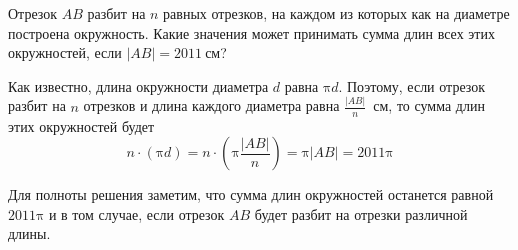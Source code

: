 ﻿


\begin{itemize}

\itB Отрезок $AB$ разбит на $n$ равных отрезков, на каждом из которых как на диаметре построена окружность. 
Какие значения может принимать сумма длин всех этих окружностей, если $|AB| = \SI{2011}{\text{см}}$?

\itr 
\begin{center}\end{center}

Как известно, длина окружности диаметра $d$ равна $\text{π}d$. 
Поэтому, если отрезок разбит на $n$ отрезков и длина каждого диаметра равна $\frac{|AB|}{n}$~см,
то сумма длин этих окружностей будет
$$
n \cdot (\text{π} d)=n \cdot \left(\text{π} \frac{|AB|}{n}\right)=\text{π} |AB|=2011\text{π}
$$

Для полноты решения заметим, что сумма длин окружностей останется равной $2011\text{π}$ и в 
том случае, если отрезок $AB$ будет разбит на отрезки различной длины.

\end{itemize}

